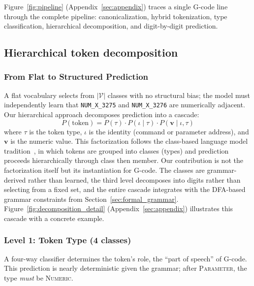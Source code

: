 \documentclass[sensors,article,submit,moreauthors,pdftex]{Definitions/mdpi}
\begin{document}
Figure~\ref{fig:pipeline} (Appendix~\ref{sec:appendix}) traces a single G-code line through the complete pipeline: canonicalization, hybrid tokenization, type classification, hierarchical decomposition, and digit-by-digit prediction.

\subsection{Hierarchical token decomposition}
\label{sec:decomposition}

\subsubsection{From Flat to Structured Prediction}

A flat vocabulary selects from $|\mathcal{V}|$ classes with no structural bias; the model must independently learn that \texttt{NUM\_X\_3275} and \texttt{NUM\_X\_3276} are numerically adjacent. Our hierarchical approach decomposes prediction into a cascade:
\begin{equation}
    P(\text{token}) = P(\tau) \cdot P(\iota \mid \tau) \cdot P(\mathbf{v} \mid \iota, \tau)
\end{equation}
where $\tau$ is the token type, $\iota$ is the identity (command or parameter address), and $\mathbf{v}$ is the numeric value. This factorization follows the class-based language model tradition~\cite{brown_classlm,morin_hsoftmax}, in which tokens are grouped into classes (types) and prediction proceeds hierarchically through class then member. Our contribution is not the factorization itself but its instantiation for G-code. The classes are grammar-derived rather than learned, the third level decomposes into digits rather than selecting from a fixed set, and the entire cascade integrates with the DFA-based grammar constraints from Section~\ref{sec:formal_grammar}. Figure~\ref{fig:decomposition_detail} (Appendix~\ref{sec:appendix}) illustrates this cascade with a concrete example.

\subsubsection{Level 1: Token Type (4 classes)}

A four-way classifier determines the token's role, the ``part of speech'' of G-code. This prediction is nearly deterministic given the grammar; after \textsc{Parameter}, the type \emph{must} be \textsc{Numeric}.
\end{document}
